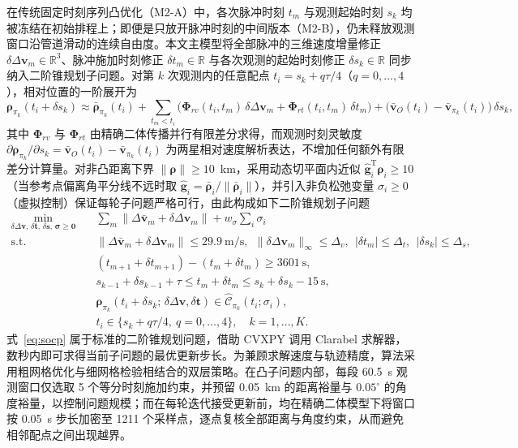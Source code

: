 在传统固定时刻序列凸优化（M2-A）中，各次脉冲时刻 $t_m$ 与观测起始时刻 $s_k$ 均被冻结在初始排程上；即便是只放开脉冲时刻的中间版本（M2-B），仍未释放观测窗口沿管道滑动的连续自由度。本文主模型将全部脉冲的三维速度增量修正 $\delta\Delta\bm v_m \in \mathbb R^3$、脉冲施加时刻修正 $\delta t_m \in \mathbb R$ 与各次观测的起始时刻修正 $\delta s_k \in \mathbb R$ 同步纳入二阶锥规划子问题。对第 $k$ 次观测内的任意配点 $t_i = s_k + q\tau/4$（$q = 0, \dots, 4$），相对位置的一阶展开为
\begin{equation}
  \bm\rho_{\pi_k}(t_i + \delta s_k) \approx \bar{\bm\rho}_{\pi_k}(t_i) + \sum_{t_m < t_i} \Big(\bm\Phi_{rv}(t_i, t_m)\,\delta\Delta\bm v_m + \bm\Phi_{rt}(t_i, t_m)\,\delta t_m\Big) + \big(\bar{\bm v}_O(t_i) - \bar{\bm v}_{\pi_k}(t_i)\big)\,\delta s_k ,
  \label{eq:linearize}
\end{equation}
其中 $\bm\Phi_{rv}$ 与 $\bm\Phi_{rt}$ 由精确二体传播并行有限差分求得，而观测时刻灵敏度 $\partial\bm\rho_{\pi_k}/\partial s_k = \bar{\bm v}_O(t_i) - \bar{\bm v}_{\pi_k}(t_i)$ 为两星相对速度解析表达，不增加任何额外有限差分计算量。对非凸距离下界 $\|\bm\rho\| \ge 10$~km，采用动态切平面内近似 $\hat{\bm g}_i^{\mathrm T}\bm\rho_i \ge 10$（当参考点偏离角平分线不远时取 $\hat{\bm g}_i = \bar{\bm\rho}_i / \|\bar{\bm\rho}_i\|$），并引入非负松弛变量 $\sigma_i \ge 0$（虚拟控制）保证每轮子问题严格可行，由此构成如下二阶锥规划子问题
\begin{equation}
  \begin{aligned}
    \min_{\delta\Delta\bm v,\,\delta\bm t,\,\delta\bm s,\,\bm\sigma \ge \bm 0}\quad & \sum_m \|\Delta\bar{\bm v}_m + \delta\Delta\bm v_m\| + w_\sigma \sum_i \sigma_i \\
    \text{s.t.}\quad & \|\Delta\bar{\bm v}_m + \delta\Delta\bm v_m\| \le 29.9~\mathrm{m/s},\ \ \|\delta\Delta\bm v_m\|_\infty \le \Delta_v,\ \ |\delta t_m| \le \Delta_t,\ \ |\delta s_k| \le \Delta_s , \\
    & (t_{m+1} + \delta t_{m+1}) - (t_m + \delta t_m) \ge 3601~\mathrm{s}, \\
    & s_{k-1} + \delta s_{k-1} + \tau \le t_m + \delta t_m \le s_k + \delta s_k - 15~\mathrm{s}, \\
    & \bm\rho_{\pi_k}(t_i + \delta s_k;\,\delta\Delta\bm v, \delta\bm t) \in \hat{\mathcal C}_{\pi_k}(t_i; \sigma_i), \\
    & t_i \in \{s_k + q\tau/4,\ q = 0,\dots,4\},\quad k = 1,\dots,K .
  \end{aligned}
  \label{eq:socp}
\end{equation}
式~\eqref{eq:socp} 属于标准的二阶锥规划问题，借助 CVXPY\cite{cvxpy2016} 调用 Clarabel\cite{clarabel2024} 求解器，数秒内即可求得当前子问题的最优更新步长。为兼顾求解速度与轨迹精度，算法采用粗网格优化与细网格检验相结合的双层策略。在凸子问题内部，每段 60.5~s 观测窗口仅选取 5 个等分时刻施加约束，并预留 0.05~km 的距离裕量与 $0.05^\circ$ 的角度裕量，以控制问题规模；而在每轮迭代接受更新前，均在精确二体模型下将窗口按 0.05~s 步长加密至 1211 个采样点，逐点复核全部距离与角度约束，从而避免相邻配点之间出现越界。

